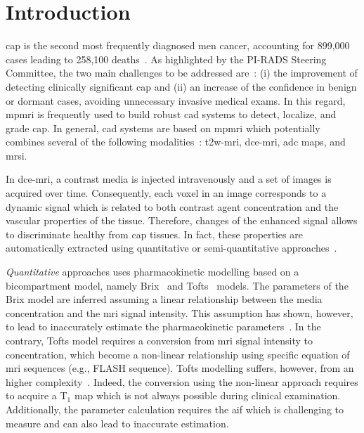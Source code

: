 \section{Introduction}

\Ac{cap} is the second most frequently diagnosed men cancer, accounting for 899,000 cases leading to 258,100 deaths~\citep{ferlay2010estimates}.
As highlighted by the PI-RADS Steering Committee, the two main challenges to be addressed are~\citep{weinreb2016pi}:
(i) the improvement of detecting clinically significant \ac{cap} and
(ii) an increase of the confidence in benign or dormant cases, avoiding unnecessary invasive medical exams.
In this regard, \ac{mpmri} is frequently used to build robust \ac{cad} systems to detect, localize, and grade \ac{cap}.
In general, \ac{cad} systems are based on \ac{mpmri} which potentially combines several of the following modalities~\citep{lemaitre2015computer}: \ac{t2w}-\ac{mri}, \ac{dce}-\ac{mri}, \ac{adc} maps, and \ac{mrsi}.

In \ac{dce}-\ac{mri}, a contrast media is injected intravenously and a set of images is acquired over time.
Consequently, each voxel in an image corresponds to a dynamic signal which is related to both contrast agent concentration and the vascular properties of the tissue.
Therefore, changes of the enhanced signal allows to discriminate healthy from \ac{cap} tissues.
In fact, these properties are automatically extracted using quantitative or semi-quantitative approaches~\citep{lemaitre2015computer}.

\emph{Quantitative} approaches uses pharmacokinetic modelling based on a bicompartment model, namely Brix~\citep{brix1991pharmacokinetic} and Tofts~\citep{tofts1995quantitative} models.
The parameters of the Brix model are inferred assuming a linear relationship between the media concentration and the \ac{mri} signal intensity.
This assumption has shown, however, to lead to inaccurately estimate the pharmacokinetic parameters~\citep{heilmann2006determination}.
In the contrary, Tofts model requires a conversion from \ac{mri} signal intensity to concentration, which become a non-linear relationship using specific equation of \ac{mri} sequences (e.g., FLASH sequence).
Tofts modelling suffers, however, from an higher complexity~\citep{gliozzi2011phenomenological}.
Indeed, the conversion using the non-linear approach requires to acquire a T$_1$ map which is not always possible during clinical examination.
Additionally, the parameter calculation requires the \ac{aif} which is challenging to measure and can also lead to inaccurate estimation.

